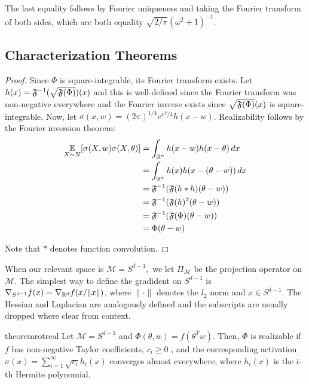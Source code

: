 The last equality follows by Fourier uniqueness and taking the Fourier transform of both sides, which are both equality $\sqrt{2/\pi}(\omega^2+1)^{-1}$. 


\subsection{Characterization Theorems}


\tranreal*

\begin{proof}
Since $\Phi$ is square-integrable, its Fourier transform exists. Let $h(x) = {\mathfrak{F}}^{-1}(\sqrt{{\mathfrak{F}}(\Phi)})(x)$ and this is well-defined since the Fourier transform was non-negative everywhere and the Fourier inverse exists since $\sqrt{{\mathfrak{F}}(\Phi)}(x)$ is square-integrable. Now, let $\sigma(x,w) = (2\pi)^{1/4}e^{x^2/4}h(x-w)$. Realizability follows by the Fourier inversion theorem:
%
\begin{align*}
    \operatorname*{\mathbb{E}}_{X \sim N}[\sigma(X,w)\sigma(X,\theta)]  &= \int_{{\mathbb{R}}^n} h(x-w)h(x-\theta) \, dx \\
    &= \int_{{\mathbb{R}}^n} h(x)h(x-(\theta-w)) \, dx \\
    &= {\mathfrak{F}}^{-1}({\mathfrak{F}}(h\ast h)(\theta -w)) \\
    &= {\mathfrak{F}}^{-1}({\mathfrak{F}}(h)^2(\theta - w)) \\
    &= {\mathfrak{F}}^{-1}({\mathfrak{F}}(\Phi)(\theta - w)) \\
    &= \Phi(\theta - w) 
\end{align*}
 
Note that $\ast$ denotes function convolution.
\end{proof}



When our relevant space is $\mathcal{M} = S^{d-1},$ we let
$\Pi_\mathcal{M}$ be the projection operator on $\mathcal{M}$. The
simplest way to define the gradident on
$S^{d-1}$ is $\nabla_{S^{d-1}} f(x) = \nabla_{{\mathbb{R}}^d} f(x/\|x\|)$, where
$\| \cdot \|$ denotes the $l_2$ norm and $x \in S^{d-1}$. 
The Hessian and Laplacian are analogously defined and the subscripts
are usually dropped where clear from context.
%
\begin{restatable}{theorem}{rotreal}
\label{thm:rotReal}
Let $\mathcal{M} = S^{d-1}$ and $\Phi(\theta,w) = f(\theta^Tw)$. Then,
$\Phi$ is realizable if $f$ has non-negative Taylor coefficients, $c_i
\geq 0$ , and the corresponding activation $\sigma(x) = \sum_{i=1}^\infty \sqrt{c_i} h_i(x)$
converges almost everywhere, where $h_i(x)$ is the i-th Hermite polynomial.
\end{restatable}


